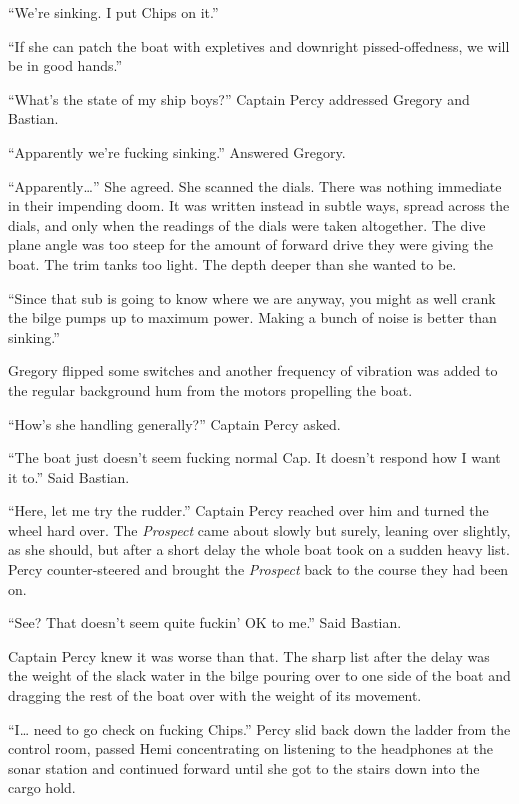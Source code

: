 \documentclass[
]{scrbook}
\begin{document}
``We're sinking. I put Chips on it.''

``If she can patch the boat with expletives and downright
pissed-offedness, we will be in good hands.''

``What's the state of my ship boys?'' Captain Percy addressed Gregory
and Bastian.

``Apparently we're fucking sinking.'' Answered Gregory.

``Apparently\ldots{}'' She agreed. She scanned the dials. There was
nothing immediate in their impending doom. It was written instead in
subtle ways, spread across the dials, and only when the readings of the
dials were taken altogether. The dive plane angle was too steep for the
amount of forward drive they were giving the boat. The trim tanks too
light. The depth deeper than she wanted to be.

``Since that sub is going to know where we are anyway, you might as well
crank the bilge pumps up to maximum power. Making a bunch of noise is
better than sinking.''

Gregory flipped some switches and another frequency of vibration was
added to the regular background hum from the motors propelling the boat.

``How's she handling generally?'' Captain Percy asked.

``The boat just doesn't seem fucking normal Cap. It doesn't respond how
I want it to.'' Said Bastian.

``Here, let me try the rudder.'' Captain Percy reached over him and
turned the wheel hard over. The \emph{Prospect} came about slowly but
surely, leaning over slightly, as she should, but after a short delay
the whole boat took on a sudden heavy list. Percy counter-steered and
brought the \emph{Prospect} back to the course they had been on.

``See? That doesn't seem quite fuckin' OK to me.'' Said Bastian.

Captain Percy knew it was worse than that. The sharp list after the
delay was the weight of the slack water in the bilge pouring over to one
side of the boat and dragging the rest of the boat over with the weight
of its movement.

``I\ldots{} need to go check on fucking Chips.'' Percy slid back down
the ladder from the control room, passed Hemi concentrating on listening
to the headphones at the sonar station and continued forward until she
got to the stairs down into the cargo hold.
\end{document}
